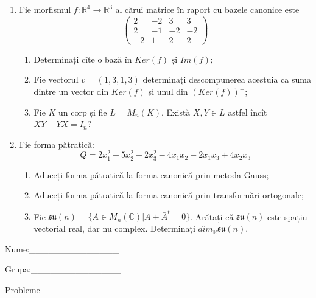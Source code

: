 \documentclass{article}
\begin{document}
\begin{enumerate}
 \item Fie morfismul $f:\mathbb{R}^4 \to \mathbb{R}^3$ al cărui matrice în raport cu bazele canonice este
$$\begin{pmatrix}
2&-2&3&3\\
2&-1&-2&-2\\
-2&1&2&2
\end{pmatrix}$$

\begin{enumerate}
\item Determinați cîte o bază în $Ker(f)$ și $Im(f)$;
\item Fie vectorul $v=(1,3,1,3)$ determinați descompunerea acestuia ca suma dintre un vector din $Ker(f)$ și unul din $(Ker(f))^\perp$;
\item Fie $K$ un corp și fie $L=M_n(K)$. Există $X,Y \in L$ astfel încît $XY-YX=I_n$?  
\end{enumerate}
\item Fie forma pătratică:
$$Q= 2x_1^2+5x_2^2+2x_3^2-4x_1x_2-2x_1x_3+4x_2x_3$$

\begin{enumerate}
\item Aduceți forma pătratică la forma canonică prin metoda Gauss;
\item Aduceți forma pătratică la forma canonică prin transformări ortogonale;
\item Fie $\mathfrak{su}(n)=\{ A \in M_n(\mathbb{C}) | A+\bar{A}^t=0\}$. Arătați că $\mathfrak{su}(n)$ este spațiu vectorial real, dar nu complex.
Determinați $dim_{\mathbb{R}}\mathfrak{su}(n)$.
\end{enumerate}
\end{enumerate}
\newpage
\begin{flushright}
Nume:\_\_\_\_\_\_\_\_\_\_\_\_\_\_
 
 
Grupa:\_\_\_\_\_\_\_\_\_\_\_\_\_\_
\end{flushright}
\begin{center}
\vspace{2cm}
{\Large Probleme}
\vspace{2cm}
\end{center}
\end{document}
